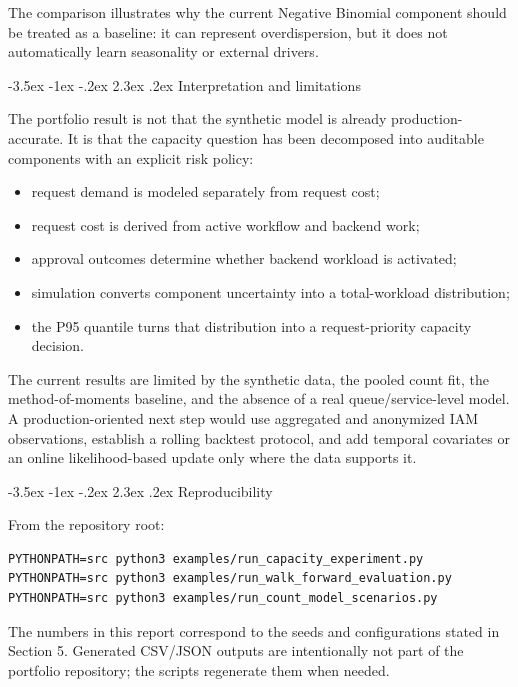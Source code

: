 \documentclass[11pt,a4paper]{article}
\makeatletter
\renewcommand\section{\@startsection{section}{1}{\z@}%
  {-3.5ex \@plus -1ex \@minus -.2ex}%
  {2.3ex \@plus .2ex}%
  {\normalfont\normalsize\bfseries\color{navy}}}
\makeatother
\begin{document}
The comparison illustrates why the current Negative Binomial component should
be treated as a baseline: it can represent overdispersion, but it does not
automatically learn seasonality or external drivers.

\section{Interpretation and limitations}

The portfolio result is not that the synthetic model is already production-
accurate. It is that the capacity question has been decomposed into auditable
components with an explicit risk policy:

\begin{itemize}
  \item request demand is modeled separately from request cost;
  \item request cost is derived from active workflow and backend work;
  \item approval outcomes determine whether backend workload is activated;
  \item simulation converts component uncertainty into a total-workload
        distribution;
  \item the P95 quantile turns that distribution into a request-priority
        capacity decision.
\end{itemize}

The current results are limited by the synthetic data, the pooled count fit,
the method-of-moments baseline, and the absence of a real queue/service-level
model. A production-oriented next step would use aggregated and anonymized IAM
observations, establish a rolling backtest protocol, and add temporal
covariates or an online likelihood-based update only where the data supports
it.

\section{Reproducibility}

From the repository root:

\begin{verbatim}
PYTHONPATH=src python3 examples/run_capacity_experiment.py
PYTHONPATH=src python3 examples/run_walk_forward_evaluation.py
PYTHONPATH=src python3 examples/run_count_model_scenarios.py
\end{verbatim}

The numbers in this report correspond to the seeds and configurations stated
in Section 5. Generated CSV/JSON outputs are intentionally not part of the
portfolio repository; the scripts regenerate them when needed.
\end{document}
